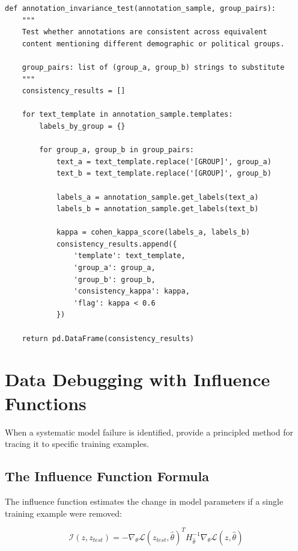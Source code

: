 \begin{lstlisting}[style=python, caption={Annotation invariance testing}]
def annotation_invariance_test(annotation_sample, group_pairs):
    """
    Test whether annotations are consistent across equivalent
    content mentioning different demographic or political groups.

    group_pairs: list of (group_a, group_b) strings to substitute
    """
    consistency_results = []

    for text_template in annotation_sample.templates:
        labels_by_group = {}

        for group_a, group_b in group_pairs:
            text_a = text_template.replace('[GROUP]', group_a)
            text_b = text_template.replace('[GROUP]', group_b)

            labels_a = annotation_sample.get_labels(text_a)
            labels_b = annotation_sample.get_labels(text_b)

            kappa = cohen_kappa_score(labels_a, labels_b)
            consistency_results.append({
                'template': text_template,
                'group_a': group_a,
                'group_b': group_b,
                'consistency_kappa': kappa,
                'flag': kappa < 0.6
            })

    return pd.DataFrame(consistency_results)
\end{lstlisting}

\section{Data Debugging with Influence Functions}

When a systematic model failure is identified,  \autocite{koh2017influence} provide a principled method for tracing it to specific training examples.

\subsection{The Influence Function Formula}

The influence function estimates the change in model parameters if a single training example were removed:

\begin{equation}
\mathcal{I}(z, z_{test}) = -\nabla_\theta \mathcal{L}(z_{test}, \hat{\theta})^T H_{\hat{\theta}}^{-1} \nabla_\theta \mathcal{L}(z, \hat{\theta})
\label{eq:influence}
\end{equation}

